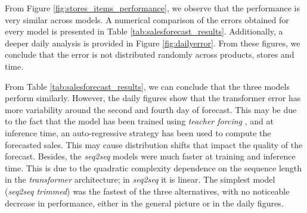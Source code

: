 From Figure \ref{fig:stores_items_performance}, we observe that the performance is very similar across models. A numerical comparison of the errors obtained for every model is presented in Table \ref{tab:salesforecast_results}. Additionally, a deeper daily analysis is provided in Figure \ref{fig:dailyerror}. From these figures, we conclude that the error is not distributed randomly across products, stores and time.

From Table \ref{tab:salesforecast_results}, we can conclude that the three models perform similarly. However, the daily figures show that the transformer error has more variability around the second and fourth day of forecast. This may be due to the fact that the model has been trained using \textit{teacher forcing} \autocite{williams1989, Goyal2016}, and at inference time, an auto-regressive strategy has been used to compute the forecasted sales. This may cause distribution shifts that impact the quality of the forecast.  Besides, the \textit{seq2seq} models were much faster at training and inference time. This is due to the quadratic complexity dependence on the sequence length in the \textit{transformer} architecture; in \textit{seq2seq} it is linear. The simplest model (\textit{seq2seq trimmed}) was the fastest of the three alternatives, with no noticeable decrease in performance, either in the general picture or in the daily figures.

